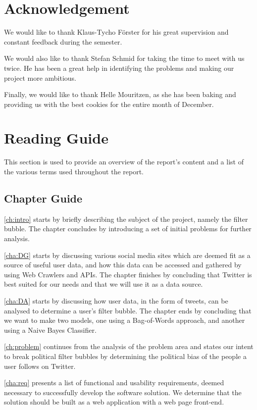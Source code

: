 \section*{Acknowledgement}
We would like to thank Klaus-Tycho Förster for his great supervision
and constant feedback during the semester.\nl

We would also like to thank Stefan Schmid for taking the time to meet with
us twice. He has been a great help in identifying the problems and making our
project more ambitious.\nl

Finally, we would like to thank Helle Mouritzen, as she has been
baking and providing us with the best cookies for the entire month of
December.\newpage


\section{Reading Guide}\label{sec:readingGuide}
This section is used to provide an overview of the report's content and a list
of the various terms used throughout the report.

\subsection{Chapter Guide}
\autoref{ch:intro} starts by briefly describing the subject of the project,
namely the filter bubble. The chapter concludes by introducing a set of initial
problems for further analysis.\nl

\autoref{cha:DG} starts by discussing various social media sites which are
deemed fit as a source of useful user data, and how this data can be
accessed and gathered by using Web Crawlers and \acsp{API}. The chapter finishes
by concluding that Twitter is best suited for our needs and that we will use it as
a data source.\nl

\autoref{cha:DA} starts by discussing how user data, in the form of tweets, can
be analysed to determine a user's filter bubble. The chapter ends by concluding
that we want to make two models, one using a Bag-of-Words approach, and another
using a Naive Bayes Classifier.\nl

\autoref{ch:problem} continues from the analysis of the problem area and states
our intent to break political filter bubbles by determining the political bias
of the people a user follows on Twitter.\nl

\autoref{cha:req} presents a list of functional and usability requirements,
deemed necessary to successfully develop the software solution. We determine
that the solution should be built as a web application with a web
page front-end.\nl

